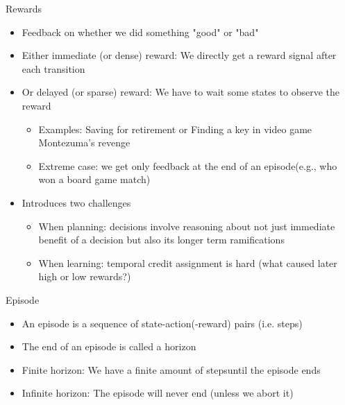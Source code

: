\begin{frame}[c]{Rewards}
	\begin{itemize}
		\item Feedback on whether we did something "good" or "bad"
		\smallskip
		\pause
		\item Either immediate (or dense) reward: We directly get a reward signal after each transition
		\item Or delayed (or sparse) reward: We have to wait some states to observe the reward
		\begin{itemize}
			\item Examples: Saving for retirement or Finding a key in video game Montezuma’s revenge
			\item Extreme case: we get only feedback at the end of an episode\newline (e.g., who won a board game match)
		\end{itemize}
		\item Introduces two challenges
		\begin{itemize}
			\item When planning: decisions involve reasoning about not just immediate
			benefit of a decision but also its longer term ramifications
			\item When learning: temporal credit assignment is hard (what caused later
			high or low rewards?)
		\end{itemize}
	\end{itemize}
\end{frame}
\begin{frame}[c]{Episode}
	\begin{itemize}
		\item An episode is a sequence of state-action(-reward) pairs (i.e. steps)
		\item The end of an episode is called a horizon
		\smallskip
		\pause
		\item Finite horizon: We have a finite amount of steps\newline until the episode ends
		\item Infinite horizon: The episode will never end (unless we abort it)
	\end{itemize}
\end{frame}
